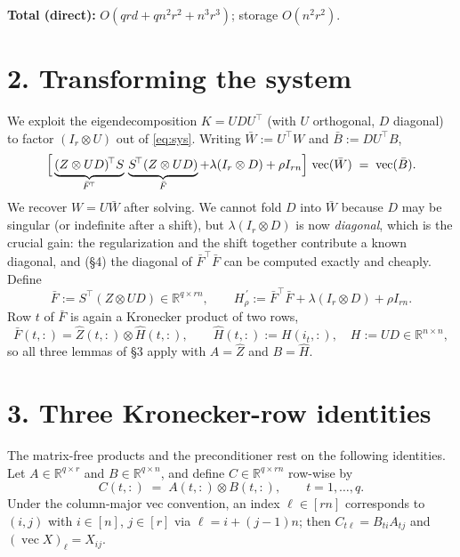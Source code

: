 \documentclass[11pt]{article}
\newcommand{\R}{\mathbb{R}}
\newcommand{\vecop}{\operatorname{vec}}
\newcommand{\bF}{\bar F}
\newcommand{\bB}{\bar B}
\newcommand{\bW}{\bar W}
\begin{document}
\medskip
\noindent\textbf{Total (direct):} $O(qrd+qn^2r^2+n^3r^3)$; storage $O(n^2r^2)$.

\section*{2. Transforming the system}

We exploit the eigendecomposition $K=UDU^{\!\top}$ (with $U$ orthogonal, $D$
diagonal) to factor $(I_r\otimes U)$ out of \eqref{eq:sys}. Writing
$\bW:=U^{\!\top}W$ and $\bB:=DU^{\!\top}B$,
\begin{equation}\label{eq:transformed}
  \Bigl[\,\underbrace{(Z\otimes UD)^{\!\top}S}_{\bF^{\!\top}}\,
          \underbrace{S^{\!\top}(Z\otimes UD)}_{\bF}
        + \lambda(I_r\otimes D) + \rho I_{rn}\Bigr]\,\vecop(\bW)
   \;=\; \vecop(\bB).
\end{equation}
We recover $W=U\bW$ after solving. We cannot fold $D$ into $\bW$ because $D$
may be singular (or indefinite after a shift), but $\lambda(I_r\otimes D)$ is
now \emph{diagonal}, which is the crucial gain: the regularization and the
shift together contribute a known diagonal, and (\S4) the diagonal of
$\bF^{\!\top}\bF$ can be computed exactly and cheaply. Define
\[
  \bF := S^{\!\top}(Z\otimes UD)\in\R^{q\times rn},
  \qquad H_\rho^{\,\prime}:=\bF^{\!\top}\bF+\lambda(I_r\otimes D)+\rho I_{rn}.
\]
Row $t$ of $\bF$ is again a Kronecker product of two rows,
\begin{equation}\label{eq:Fbar-rows}
  \bF(t,:)=\widehat Z(t,:)\otimes \widehat H(t,:),
  \qquad \widehat H(t,:):=H(i_t,:),\quad H:=UD\in\R^{n\times n},
\end{equation}
so all three lemmas of \S3 apply with $A=\widehat Z$ and $B=\widehat H$.

\section*{3. Three Kronecker-row identities}

The matrix-free products and the preconditioner rest on the following
identities. Let $A\in\R^{q\times r}$ and $B\in\R^{q\times n}$, and define
$C\in\R^{q\times rn}$ row-wise by
\begin{equation}\label{eq:Crows}
  C(t,:) \;=\; A(t,:)\otimes B(t,:),\qquad t=1,\dots,q.
\end{equation}
Under the column-major vec convention, an index $\ell\in[rn]$ corresponds to
$(i,j)$ with $i\in[n]$, $j\in[r]$ via $\ell=i+(j-1)n$; then
$C_{t\ell}=B_{ti}A_{tj}$ and $(\vecop X)_\ell=X_{ij}$.
\end{document}
